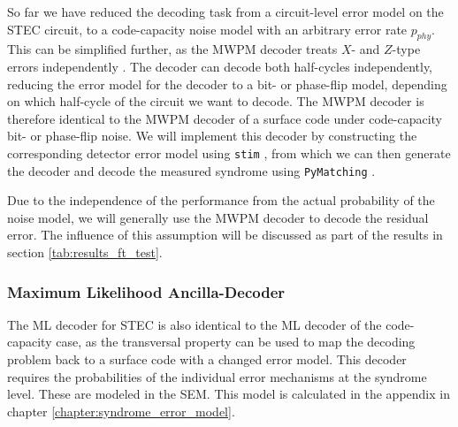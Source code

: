 So far we have reduced the decoding task from a circuit-level error model on the STEC circuit, 
to a code-capacity noise model with an arbitrary error rate $p_{phy}$.
This can be simplified further, 
as the MWPM decoder treats $X$- and $Z$-type errors independently \cite{pymatching_loger_paper}.
The decoder can decode both half-cycles independently, 
reducing the error model for the decoder to a bit- or phase-flip model, 
depending on which half-cycle of the circuit we want to decode. 
The MWPM decoder is therefore identical to the MWPM decoder of a surface code under code-capacity bit- or phase-flip noise.
We will implement this decoder by constructing the corresponding detector error model using \texttt{stim} \cite{stim}, 
from which we can then generate the decoder and decode the measured syndrome using \texttt{PyMatching} \cite{pymatching_loger_paper}. 

Due to the independence of the performance from the actual probability of the noise model, 
we will generally use the MWPM decoder to decode the residual error.
The influence of this assumption will be discussed as part of the results in section \ref{tab:results_ft_test}.


\subsubsection{Maximum Likelihood Ancilla-Decoder}\label{sssec:stec_decoder_adaption_ML}


The ML decoder for STEC is also identical to the ML decoder of the code-capacity case,
as the transversal property can be used to map the decoding problem back to a surface code with a changed error model.
This decoder requires the probabilities of the individual error mechanisms at the syndrome level.
These are modeled in the SEM.
This model is calculated in the appendix in chapter \ref{chapter:syndrome_error_model}.

